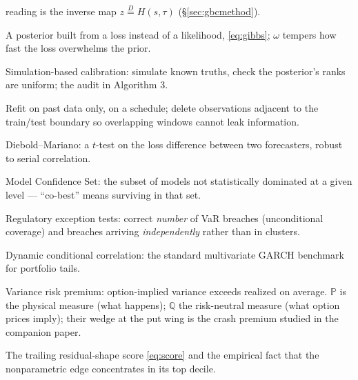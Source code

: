 \documentclass[11pt]{article}
\newcommand{\Q}{\mathbb{Q}}
\newcommand{\PP}{\mathbb{P}}
\theoremstyle{remark}
\begin{document}
\begin{description}[leftmargin=1.6em,itemsep=1pt,font=\normalfont\bfseries]
reading is the inverse map $z \overset{D}{=} H(s,\tau)$
(\S\ref{sec:gbcmethod}).
\item[Gibbs / generalized-Bayes posterior] A posterior built from a
loss instead of a likelihood, \eqref{eq:gibbs}; $\omega$ tempers how
fast the loss overwhelms the prior.
\item[SBC] Simulation-based calibration: simulate known truths, check
the posterior's ranks are uniform; the audit in Algorithm 3.
\item[Walk-forward, purge, embargo] Refit on past data only, on a
schedule; delete observations adjacent to the train/test boundary so
overlapping windows cannot leak information.
\item[DM test] Diebold--Mariano: a $t$-test on the loss difference
between two forecasters, robust to serial correlation.
\item[MCS] Model Confidence Set: the subset of models not
statistically dominated at a given level --- ``co-best'' means surviving
in that set.
\item[Kupiec / Christoffersen] Regulatory exception tests: correct
\emph{number} of VaR breaches (unconditional coverage) and breaches
arriving \emph{independently} rather than in clusters.
\item[DCC] Dynamic conditional correlation: the standard multivariate
GARCH benchmark for portfolio tails.
\item[VRP; $\PP$ vs.\ $\Q$] Variance risk premium: option-implied
variance exceeds realized on average. $\PP$ is the physical measure
(what happens); $\Q$ the risk-neutral measure (what option prices
imply); their wedge at the put wing is the crash premium studied in the
companion paper.
\item[Misspecification frontier] The trailing residual-shape score
\eqref{eq:score} and the empirical fact that the nonparametric edge
concentrates in its top decile.
\end{description}
\end{document}
